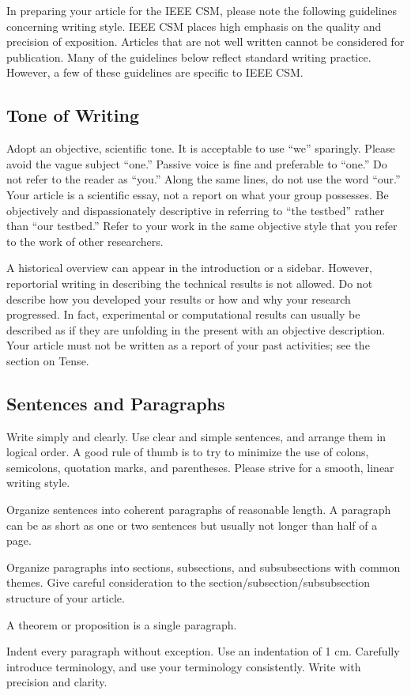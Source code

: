 In preparing your article for the IEEE CSM, please note the following guidelines concerning writing style.  IEEE CSM places high emphasis on the quality and precision of exposition.  Articles that are not well written cannot be considered for publication. Many of the guidelines below reflect standard writing practice.  However, a few of these guidelines are specific to IEEE CSM.

\subsection{Tone of Writing}
Adopt an objective, scientific tone.  It is acceptable to use ``we'' sparingly. Please avoid the vague subject ``one.''  Passive voice is fine and preferable to ``one.''  Do not refer to the reader as ``you.''  Along the same lines, do not use the word ``our.''  Your article is a scientific essay, not a report on what your group possesses.  Be objectively and dispassionately descriptive in referring to ``the testbed'' rather than ``our testbed.''  Refer to your work in the same objective style that you refer to the work of other researchers.

A historical overview can appear in the introduction or a sidebar.  However, reportorial writing in describing the technical results is not allowed.  Do not describe how you developed your results or how and why your research progressed.  In fact, experimental or computational results can usually be described as if they are unfolding in the present with an objective description.  Your article must not be written as a report of your past activities; see the section on Tense.

\subsection{Sentences and Paragraphs}
Write simply and clearly.  Use clear and simple sentences, and arrange them in logical order.  A good rule of thumb is to try to minimize the use of colons, semicolons, quotation marks, and parentheses.  Please strive for a smooth, linear writing style. 
\bi
\item Organize sentences into coherent paragraphs of reasonable length.  A paragraph can be as short as one or two sentences but usually not longer than half of a page.  
\item  Organize paragraphs into sections, subsections, and subsubsections with common themes.  Give careful consideration to the section/subsection/subsubsection structure of your article. 
\item A theorem or proposition is a single paragraph. 
\item Indent every paragraph without exception.   Use an indentation of 1 cm.
\ei
Carefully introduce terminology, and use your terminology consistently. Write with precision and clarity.

